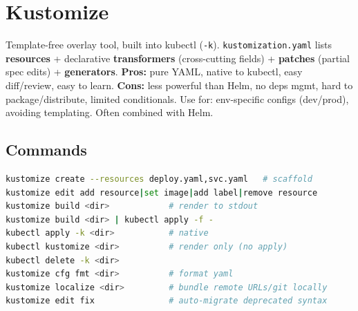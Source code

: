 \renewcommand{\chapcolor}{chKustomize}
\section{Kustomize}
Template-free overlay tool, built into kubectl (\texttt{-k}). \texttt{kustomization.yaml} lists \textbf{resources} + declarative \textbf{transformers} (cross-cutting fields) + \textbf{patches} (partial spec edits) + \textbf{generators}. \textbf{Pros:} pure YAML, native to kubectl, easy diff/review, easy to learn. \textbf{Cons:} less powerful than Helm, no deps mgmt, hard to package/distribute, limited conditionals. Use for: env-specific configs (dev/prod), avoiding templating. Often combined with Helm.

\subsection{Commands}
\begin{lstlisting}[language=sh]
kustomize create --resources deploy.yaml,svc.yaml   # scaffold
kustomize edit add resource|set image|add label|remove resource
kustomize build <dir>            # render to stdout
kustomize build <dir> | kubectl apply -f -
kubectl apply -k <dir>           # native
kubectl kustomize <dir>          # render only (no apply)
kubectl delete -k <dir>
kustomize cfg fmt <dir>          # format yaml
kustomize localize <dir>         # bundle remote URLs/git locally
kustomize edit fix               # auto-migrate deprecated syntax
\end{lstlisting}

